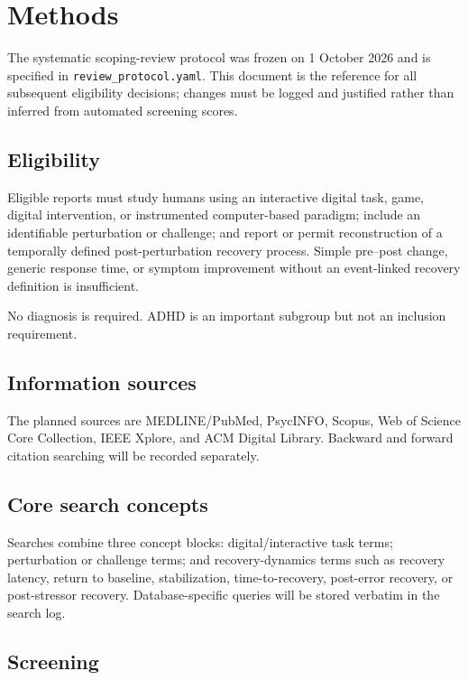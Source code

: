 \section{Methods}

The systematic scoping-review protocol was frozen on 1 October 2026 and is specified in \texttt{review\_protocol.yaml}. This document is the reference for all subsequent eligibility decisions; changes must be logged and justified rather than inferred from automated screening scores.

\subsection{Eligibility}

Eligible reports must study humans using an interactive digital task, game, digital intervention, or instrumented computer-based paradigm; include an identifiable perturbation or challenge; and report or permit reconstruction of a temporally defined post-perturbation recovery process. Simple pre--post change, generic response time, or symptom improvement without an event-linked recovery definition is insufficient.

No diagnosis is required. ADHD is an important subgroup but not an inclusion requirement.

\subsection{Information sources}

The planned sources are MEDLINE/PubMed, PsycINFO, Scopus, Web of Science Core Collection, IEEE Xplore, and ACM Digital Library. Backward and forward citation searching will be recorded separately.

\subsection{Core search concepts}

Searches combine three concept blocks: digital/interactive task terms; perturbation or challenge terms; and recovery-dynamics terms such as recovery latency, return to baseline, stabilization, time-to-recovery, post-error recovery, or post-stressor recovery. Database-specific queries will be stored verbatim in the search log.

\subsection{Screening}

